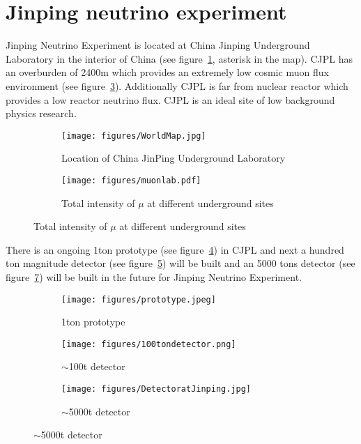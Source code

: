 \section{Jinping neutrino experiment} %
Jinping Neutrino Experiment is located at China Jinping Underground Laboratory in the interior of China (see figure~\ref{fig:cjpl}, asterisk in the map). CJPL has an overburden of 2400m which provides an extremely low cosmic muon flux environment (see figure~\ref{fig:muon}). Additionally CJPL is far from nuclear reactor which provides a low reactor neutrino flux. CJPL is an ideal site of low background physics research. 

\begin{figure}[H]
\begin{minipage}{.5\textwidth}
\begin{figure}[H]
    \centering
        \texttt{[image: figures/WorldMap.jpg]}
    \caption{\label{fig:cjpl} Location of China JinPing Underground Laboratory}
\end{figure}
\end{minipage}
\begin{minipage}{.5\textwidth}
\begin{figure}[H]
    \centering
        \texttt{[image: figures/muonlab.pdf]}
    \caption{\label{fig:muon} Total intensity of $\mu$ at different underground sites}
\end{figure}
\end{minipage}
\end{figure}

There is an ongoing 1ton prototype (see figure~\ref{fig:1t}) in CJPL and next a hundred ton magnitude detector (see figure~\ref{fig:100t}) will be built and an 5000 tons detector (see figure~\ref{fig:1kt}) will be built in the future for Jinping Neutrino Experiment. 

\begin{figure}[H]
\centering
\begin{minipage}{.3\textwidth}
\begin{figure}[H]
    \centering
    \texttt{[image: figures/prototype.jpeg]}
    \caption{\label{fig:1t} 1ton prototype}
\end{figure}
\end{minipage}
\begin{minipage}{.3\textwidth}
\begin{figure}[H]
    \centering
    \texttt{[image: figures/100tondetector.png]}
    \caption{\label{fig:100t} $\sim$100t detector}
\end{figure}
\end{minipage}
\begin{minipage}{.3\textwidth}
\begin{figure}[H]
    \centering
    \texttt{[image: figures/DetectoratJinping.jpg]}
    \caption{\label{fig:1kt} $\sim$5000t detector}
\end{figure}
\end{minipage}
\end{figure}

